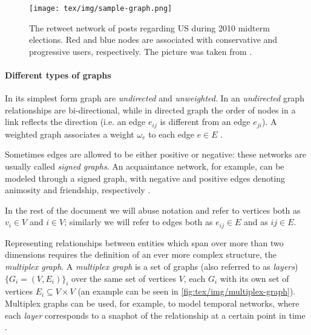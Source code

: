 \begin{figure}
	\centering
	\texttt{[image: tex/img/sample-graph.png]}
	\caption[Retweet network during 2010 midterm elections]{The retweet network of posts regarding US during 2010 midterm
		elections. Red and blue nodes are associated with conservative and
		progressive users, respectively. The picture was taken from
		\cite{Menczer2020}.}
	\label{fig:tex/img/sample-graph}
\end{figure}

\paragraph{Different types of graphs}%
\label{par:different_types_of_graphs}

In its simplest form graph are \emph{undirected} and \emph{unweighted}. In an
\emph{undirected} graph relationships are bi-directional, while in directed graph
the order of nodes in a link reflects the
direction (i.e. an edge $e_{ij} $ is different from an edge $e_{ji} $). A weighted
graph associates a weight $\omega _e$ to each edge $e \in E$
\cite{Menczer2020}\cite{AlbertLaszloNortheasternUniversity2016}.

Sometimes edges are allowed to be either positive or negative: these networks
are usually called \emph{signed graphs}. An acquaintance
network, for example, can be modeled through a signed graph, with negative and
positive edges denoting animosity and friendship, respectively \cite{Newman2018}.

\bigskip

In the rest of the document we will abuse notation and refer to vertices both
as $v_{i} \in V $ and $i \in V$; similarly we will refer to edges both as
$e_{ij} \in E $ and as $ij \in E$.

\bigskip

Representing relationships between entities which span over more than two
dimensions requires the definition of an ever more complex structure, the
\emph{multiplex graph}. A \emph{multiplex graph} is a set of graphs (also
referred to as \emph{layers}) $\{ G_i = (V, E_i)\} _i$ over the same set of
vertices $V$, each $G_i$ with its own set of vertices $E_i \subseteq V \times V $ (an
example can be seen in \autoref{fig:tex/img/multiplex-graph}). Multiplex graphs
can be used, for example, to model temporal networks, where
each \emph{layer} corresponds to a snaphot of the relationship at a certain
point in time \cite{Newman2018}.

